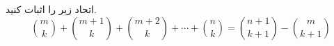 اتحاد زیر را اثبات کنید.
$$\binom{m}{k} + \binom{m + 1}{k} + \binom{m + 2}{k} + \cdots + \binom{n}{k} = \binom{n + 1}{k + 1} - \binom{m}{k + 1}$$